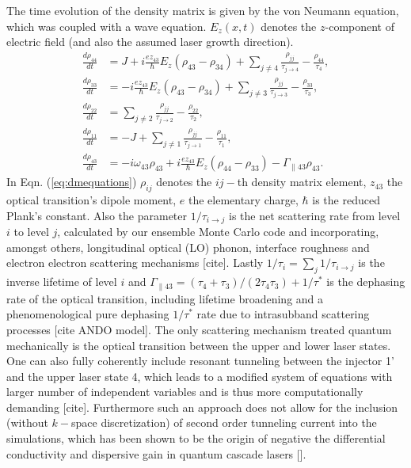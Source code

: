 \documentclass[11pt,final]{scrbook}
\begin{document}
The time evolution of the density matrix is given by the von Neumann equation, which was coupled with a wave equation. $E_z(x,t)$ denotes the $z$-component of electric field (and also the assumed laser growth direction).  
\begin{subequations}
	\label{eq:dmequations}
 \begin{align}
	\frac{d\rho_{44}}{dt} &= J +i\frac{ez_{43}}{\hbar}E_z(\rho_{43}-\rho_{34}) + \sum_{j\neq 4} \frac{\rho_{jj}}{\tau_{j\rightarrow 4}}  - \frac{\rho_{44}}{\tau_{4}}, \\
	\frac{d\rho_{33}}{dt} &= -i\frac{ez_{43}}{\hbar}E_z(\rho_{43}-\rho_{34}) + \sum_{j\neq 3} \frac{\rho_{jj}}{\tau_{j\rightarrow 3}} - \frac{\rho_{33}}{\tau_{3}}, \\
	\frac{d\rho_{22}}{dt} &= \sum_{j\neq 2} \frac{\rho_{jj}}{\tau_{j\rightarrow 2}} - \frac{\rho_{22}}{\tau_{2}}, \\
	\frac{d\rho_{11}}{dt} &=  -J + \sum_{j\neq 1} \frac{\rho_{jj}}{\tau_{j\rightarrow 1}} - \frac{\rho_{11}}{\tau_{1}}, \\
	\frac{d\rho_{43}}{dt} &= - i\omega_{43}\rho_{43} + i\frac{ez_{43}}{\hbar}E_z(\rho_{44}-\rho_{33})-\Gamma_{\parallel 43}\rho_{43}.
 \end{align}
\end{subequations}
In Eqn. (\ref{eq:dmequations}) $\rho_{ij}$ denotes the $ij-$th density matrix element,  $z_{43}$ the optical transition's dipole moment, $e$ the elementary charge, $\hbar$ is the reduced Plank's constant. Also the parameter $1/\tau_{i\rightarrow j}$ is the net scattering rate from level $i$ to level $j$, calculated by our ensemble Monte Carlo code and incorporating, amongst others, longitudinal optical (LO) phonon, interface roughness and electron electron scattering mechanisms [cite]. Lastly $1/\tau_{i} = \sum_j 1/\tau_{i\rightarrow j}$ is the inverse lifetime of level $i$ and $\Gamma_{\parallel 43} = (\tau_4+\tau_3)/(2\tau_4\tau_3)+1/\tau^*$ is the dephasing rate of the optical transition, including lifetime broadening and a phenomenological pure dephasing $1/\tau^*$ rate due to intrasubband scattering processes [cite ANDO model]. The only scattering mechanism treated quantum mechanically is the optical transition between the upper and lower laser states. One can also fully coherently include resonant tunneling between the injector 1' and the upper laser state 4, which leads to a modified system of equations with larger number of independent variables and is thus more computationally demanding [cite]. Furthermore such an approach does not allow for the inclusion (without $k-$space discretization) of second order tunneling current into the simulations, which has been shown to be the origin of negative the differential conductivity and dispersive gain in quantum cascade lasers []. 
\end{document}
